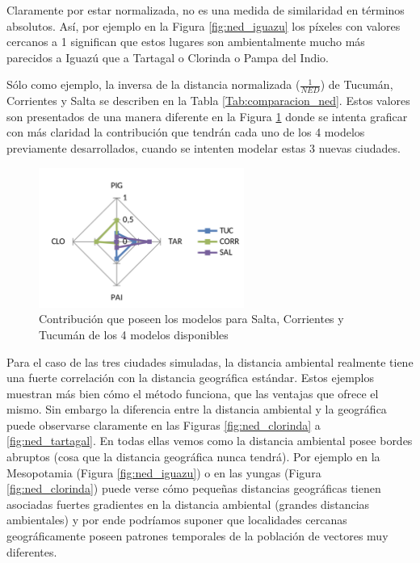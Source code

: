   \par Claramente por estar normalizada, no es una medida de similaridad en
    términos absolutos. Así, por ejemplo en la Figura \ref{fig:ned_iguazu} los
    píxeles con valores
    cercanos a 1 significan que estos lugares son ambientalmente mucho más
    parecidos a Iguazú que a Tartagal o Clorinda o Pampa del Indio.


  \par Sólo como ejemplo, la inversa de la distancia normalizada ($\frac{1}{NED}$)
    de Tucumán, Corrientes y Salta se describen en la Tabla \ref{Tab:comparacion_ned}.
    Estos valores son presentados de una manera diferente en la Figura \ref{fig:ned_contrib}
    donde se intenta graficar con más claridad la contribución que tendrán cada
    uno de los 4 modelos previamente desarrollados, cuando se intenten modelar
    estas 3 nuevas ciudades.
    \begin{figure}[hbt]
      \centering%
      \includegraphics[width=0.6\textwidth]{images/ned_contrib}%
      \caption{Contribución que poseen los modelos para Salta, Corrientes y
              Tucumán de los 4 modelos disponibles}\label{fig:ned_contrib}
    \end{figure}

  \par Para el caso de las tres ciudades simuladas, la distancia ambiental
    realmente tiene una fuerte correlación con la distancia geográfica estándar.
    Estos ejemplos muestran más bien cómo el método funciona, que las ventajas
    que ofrece el mismo. Sin embargo la diferencia entre la distancia ambiental
    y la geográfica puede observarse claramente en las Figuras \ref{fig:ned_clorinda}
    a \ref{fig:ned_tartagal}.
    En todas ellas vemos como la distancia ambiental posee bordes abruptos
    (cosa que la distancia geográfica nunca tendrá).
    Por ejemplo en la Mesopotamia (Figura \ref{fig:ned_iguazu}) o en las yungas
    (Figura \ref{fig:ned_clorinda}) puede verse
    cómo pequeñas distancias geográficas tienen asociadas fuertes gradientes en
    la distancia ambiental (grandes distancias ambientales) y por ende
    podríamos suponer que localidades cercanas geográficamente poseen patrones
    temporales de la población de vectores muy diferentes.

